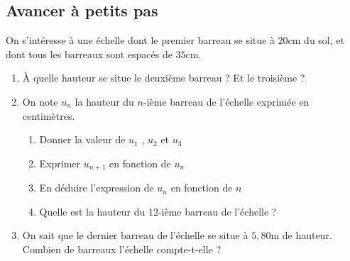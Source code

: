 \documentclass[oneside,12pt]{article}          %
\begin{document}
\subsection{Avancer à petits pas}
On s'intéresse à une échelle dont le premier barreau se situe à $20$cm du sol, et dont tous les barreaux sont espacés de $35$cm.
\begin{enumerate}
	\item À quelle hauteur se situe le deuxième barreau ? Et le troisième ?
	\item On note $u_n$ la hauteur du $n$-ième barreau de l'échelle exprimée en centimètres.
	\begin{enumerate}
		\item Donner la valeur de $u_1$ , $u_2$ et $u_3$
		\item Exprimer $u_{n+1}$ en fonction de $u_n$
		\item En déduire l'expression de $u_n$ en fonction de $n$
		\item Quelle est la hauteur du 12-ième barreau de l'échelle ?
	\end{enumerate}
	\item On sait que le dernier barreau de l'échelle se situe à $5,80$m de hauteur. \\
	Combien de barreaux l'échelle compte-t-elle ?
\end{enumerate}
\end{document}
